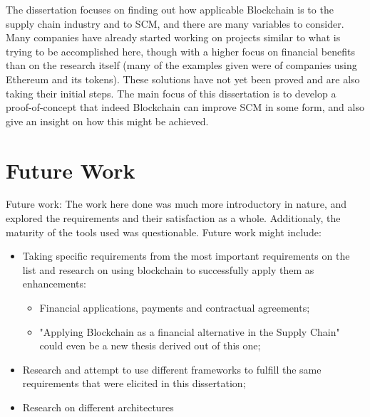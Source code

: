 
The dissertation focuses on finding out how applicable Blockchain is to the supply chain industry and to SCM, and there are many variables to consider. Many companies have already started working on projects similar to what is trying to be accomplished here, though with a higher focus on financial benefits than on the research itself (many of the examples given were of companies using Ethereum and its tokens). These solutions have not yet been proved and are also taking their initial steps. The main focus of this dissertation is to develop a proof-of-concept that indeed Blockchain can improve SCM in some form, and also give an insight on how this might be achieved. 

\section{Future Work}

Future work: The work here done was much more introductory in nature, and explored the requirements and their satisfaction as a whole. Additionaly, the maturity of the tools used was questionable. 
Future work might include:
\begin{itemize}
	\item Taking specific requirements from the most important requirements on the list and research on using blockchain to successfully apply them as enhancements:
	\begin{itemize}
		\item Financial applications, payments and contractual agreements;
		\item "Applying Blockchain as a financial alternative in the Supply Chain" could even be a new thesis derived out of this one;
	\end{itemize}
	\item Research and attempt to use different frameworks to fulfill the same requirements that were elicited in this dissertation;
    \item Research on different architectures
\end{itemize} 


